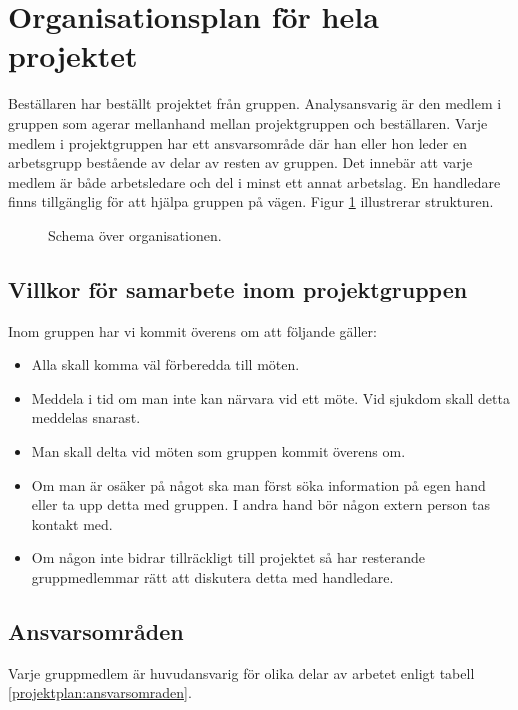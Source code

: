 \section{Organisationsplan för hela projektet}
Beställaren har beställt projektet från gruppen. Analysansvarig är den medlem i gruppen som agerar mellanhand mellan projektgruppen och beställaren. Varje medlem i projektgruppen har ett ansvarsområde där han eller hon leder en arbetsgrupp bestående av delar av resten av gruppen. Det innebär att varje medlem är både arbetsledare och del i minst ett annat arbetslag. En handledare finns tillgänglig för att hjälpa gruppen på vägen. Figur \ref{projektplan:organisationsplan} illustrerar strukturen.

\begin{figure}[H]
\center
{}%

%
\caption{Schema över organisationen.} \label{projektplan:organisationsplan}
\endcenter
\end{figure}

\subsection{Villkor för samarbete inom projektgruppen}
Inom gruppen har vi kommit överens om att följande gäller:
\begin{itemize}
\item{Alla skall komma väl förberedda till möten.}
\item{Meddela i tid om man inte kan närvara vid ett möte. Vid sjukdom skall detta meddelas snarast.}
\item{Man skall delta vid möten som gruppen kommit överens om.}

\item{Om man är osäker på något ska man först söka information på egen hand eller ta upp detta med gruppen. I andra hand bör någon extern person tas kontakt med.}
\item{Om någon inte bidrar tillräckligt till projektet så har resterande gruppmedlemmar rätt att diskutera detta med handledare.}
\end{itemize}

\newpage
\subsection{Ansvarsområden}
Varje gruppmedlem är huvudansvarig för olika delar av arbetet enligt tabell \ref{projektplan:ansvarsomraden}.

